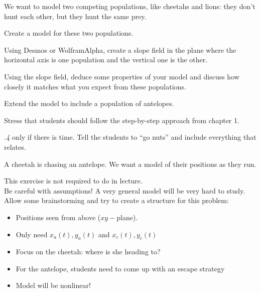 \question We want to model two competing populations, like cheetahs and lions: they don't hunt each other, but they hunt the same prey.
\begin{parts}
	\item Create a model for these two populations.
	\item Using Desmos or WolframAlpha, create a slope field in the plane where the horizontal axis is one population and the vertical one is the other.
	\item Using the slope field, deduce some properties of your model and discuss how closely it matches what you expect from these populations.

	\item Extend the model to include a population of antelopes.	
\end{parts}
\begin{annotation}
	\begin{goals}
		Stress that students should follow the step-by-step approach from chapter 1.
		
		\emph{.4} only if there is time. Tell the students to ``go nuts'' and include everything that relates.
	\end{goals}
\end{annotation}





\bookonlynewpage


\question
	A cheetah is chasing an antelope. We want a model of their positions as they run.
	
	
\begin{annotation}
	\begin{goals}
		This exercise is not required to do in lecture. \\
		
		Be careful with assumptions! A very general model will be very hard to study. \\
		
		Allow some brainstorming and try to create a structure for this problem:
		\begin{itemize}
			\item Positions seen from above ($xy-$plane).
			\item Only need $x_a(t), y_a(t)$ and $x_c(t), y_c(t)$
			\item Focus on the cheetah: where is she heading to?
			\item For the antelope, students need to come up with an escape strategy
			\item Model will be nonlinear!
		\end{itemize}
	\end{goals}
\end{annotation}




